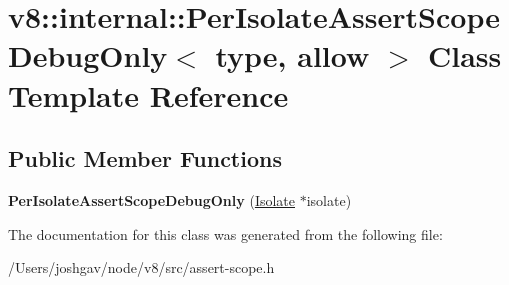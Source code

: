 \hypertarget{classv8_1_1internal_1_1_per_isolate_assert_scope_debug_only}{}\section{v8\+:\+:internal\+:\+:Per\+Isolate\+Assert\+Scope\+Debug\+Only$<$ type, allow $>$ Class Template Reference}
\label{classv8_1_1internal_1_1_per_isolate_assert_scope_debug_only}
\subsection*{Public Member Functions}
\begin{DoxyCompactItemize}
\item 
{\bfseries Per\+Isolate\+Assert\+Scope\+Debug\+Only} (\hyperlink{classv8_1_1internal_1_1_isolate}{Isolate} $\ast$isolate)\hypertarget{classv8_1_1internal_1_1_per_isolate_assert_scope_debug_only_a51539975c189358a1eb6c6f3539945cb}{}\label{classv8_1_1internal_1_1_per_isolate_assert_scope_debug_only_a51539975c189358a1eb6c6f3539945cb}

\end{DoxyCompactItemize}


The documentation for this class was generated from the following file\+:\begin{DoxyCompactItemize}
\item 
/\+Users/joshgav/node/v8/src/assert-\/scope.\+h\end{DoxyCompactItemize}
